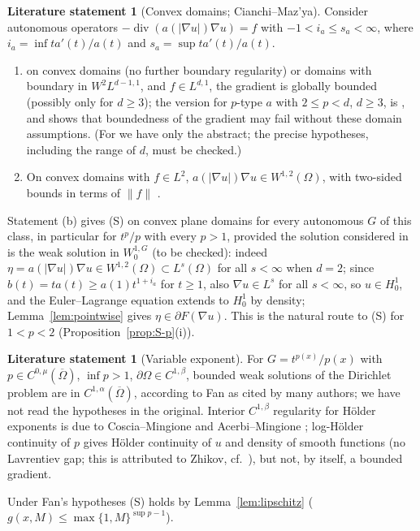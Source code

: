\documentclass[11pt]{amsart}
\theoremstyle{definition}
\newtheorem{fact}[theorem]{Literature statement}
\theoremstyle{remark}
\numberwithin{equation}{section}
\newcommand{\abs}[1]{\lvert #1\rvert}
\newcommand{\norm}[1]{\lVert #1\rVert}
\DeclareMathOperator{\divg}{div}
\begin{document}
\begin{fact}[Convex domains; Cianchi--Maz'ya]\label{fact:CM}
Consider autonomous operators $-\divg(a(\abs{\nabla u})\nabla u)=f$ with $-1<i_a\le s_a<\infty$, where $i_a=\inf ta'(t)/a(t)$ and $s_a=\sup ta'(t)/a(t)$.
\begin{enumerate}[label=(\alph*)]
\item on convex domains (no further boundary regularity) or domains with boundary in $W^2L^{d-1,1}$, and $f\in L^{d,1}$, the gradient is globally bounded \cite{CianchiMazya2011} (possibly only for $d\ge3$); the version for $p$-type $a$ with $2\le p<d$, $d\ge3$, is \cite[Thm.~3.5]{CianchiMazya2014JEMS}, and \cite{CianchiMazya2014JEMS} shows that boundedness of the gradient may fail without these domain assumptions. (For \cite{CianchiMazya2011} we have only the abstract; the precise hypotheses, including the range of $d$, must be checked.)
\item On convex domains with $f\in L^2$, $a(\abs{\nabla u})\nabla u\in W^{1,2}(\Omega)$, with two-sided bounds in terms of $\norm f$ \cite[Thm.~2.3]{CianchiMazya2018}.
\end{enumerate}
\end{fact}
Statement (b) gives (S) on convex plane domains for every autonomous $G$ of this class, in particular for $t^p/p$ with every $p>1$, provided the solution considered in \cite{CianchiMazya2018} is the weak solution in $W^{1,G}_0$ (to be checked): indeed $\eta=a(\abs{\nabla u})\nabla u\in W^{1,2}(\Omega)\subset L^s(\Omega)$ for all $s<\infty$ when $d=2$; since $b(t)=ta(t)\ge a(1)t^{1+i_a}$ for $t\ge1$, also $\nabla u\in L^s$ for all $s<\infty$, so $u\in H^1_0$, and the Euler--Lagrange equation extends to $H^1_0$ by density; Lemma~\ref{lem:pointwise} gives $\eta\in\partial F(\nabla u)$. This is the natural route to (S) for $1<p<2$ (Proposition~\ref{prop:S-p}(i)).

\begin{fact}[Variable exponent]\label{fact:px}
For $G=t^{p(x)}/p(x)$ with $p\in C^{0,\mu}(\overline\Omega)$, $\inf p>1$, $\partial\Omega\in C^{1,\beta}$, bounded weak solutions of the Dirichlet problem are in $C^{1,\alpha}(\overline\Omega)$, according to Fan \cite{Fan2007} as cited by many authors; we have not read the hypotheses in the original. Interior $C^{1,\beta}$ regularity for H\"older exponents is due to Coscia--Mingione \cite{CosciaMingione1999} and Acerbi--Mingione \cite{AcerbiMingione2001}; log-H\"older continuity of $p$ gives H\"older continuity of $u$ and density of smooth functions (no Lavrentiev gap; this is attributed to Zhikov, cf.\ \cite{Zhikov1995}), but not, by itself, a bounded gradient.
\end{fact}
Under Fan's hypotheses (S) holds by Lemma~\ref{lem:lipschitz} ($g(x,M)\le\max\{1,M\}^{\sup p-1}$).
\end{document}
